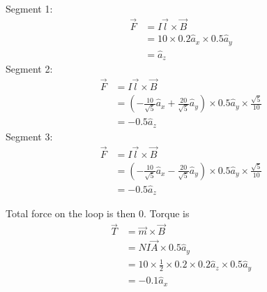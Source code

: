 \documentclass[answers]{exam}
\begin{document}
\begin{questions}
\begin{solution}
    Segment 1:
    \begin{align*}
        \vec F &= I\vec l \times \vec B \\
               &= 10 \times 0.2 \hat a_x \times 0.5 \hat a_y \\
               &= \hat a_z
    \end{align*}
    Segment 2:
    \begin{align*}
        \vec F &= I\vec l \times \vec B \\
               &= \left(-\frac{10}{\sqrt{5}}\hat a_x + \frac{20}{\sqrt{5}}\hat a_y\right) \times 0.5 \hat a_y \times \frac{\sqrt{5}}{10} \\
               &= -0.5 \hat a_z
    \end{align*}
    Segment 3:
    \begin{align*}
        \vec F &= I\vec l \times \vec B \\
               &= \left(-\frac{10}{\sqrt{5}}\hat a_x - \frac{20}{\sqrt{5}} \hat a_y\right) \times 0.5 \hat a_y \times \frac{\sqrt{5}}{10} \\
               &= -0.5 \hat a_z
    \end{align*}

    Total force on the loop is then 0. Torque is
    \begin{align*}
        \vec T &= \vec m \times \vec B \\
               &= NI\vec A \times 0.5\hat a_y \\
               &= 10 \times \frac{1}{2} \times 0.2 \times 0.2 \hat a_z \times 0.5 \hat a_y \\
               &= -0.1\hat a_x
    \end{align*}
\end{solution}

\end{questions}
\end{document}
